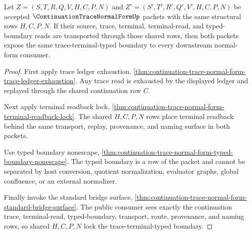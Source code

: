 \begin{theorem}
\label{thm:continuation-trace-normal-form-trace-terminal-typed-lock}
Let $Z=(S,T,R,Q,V,H,C,P,N)$ and $Z'=(S',T',R',Q',V',H,C,P,N)$ be accepted $\ContinuationTraceNormalFormUp$ packets with the same structural rows $H,C,P,N$. If their source, trace, terminal, terminal-read, and typed-boundary reads are transported through those shared rows, then both packets expose the same trace-terminal-typed boundary to every downstream normal-form consumer.
\end{theorem}
\begin{proof}
First apply trace ledger exhaustion, \autoref{thm:continuation-trace-normal-form-trace-ledger-exhaustion}. Any trace read is exhausted by the displayed ledger and replayed through the shared continuation row $C$.

Next apply terminal readback lock, \autoref{thm:continuation-trace-normal-form-terminal-readback-lock}. The shared $H,C,P,N$ rows place terminal readback behind the same transport, replay, provenance, and naming surface in both packets.

Use typed boundary nonescape, \autoref{thm:continuation-trace-normal-form-typed-boundary-nonescape}. The typed boundary is a row of the packet and cannot be separated by host conversion, quotient normalization, evaluator graphs, global confluence, or an external normalizer.

Finally invoke the standard bridge surface, \autoref{thm:continuation-trace-normal-form-standard-bridge-surface}. The public consumer sees exactly the continuation trace, terminal-read, typed-boundary, transport, route, provenance, and naming rows, so shared $H,C,P,N$ lock the trace-terminal-typed boundary.
\end{proof}

